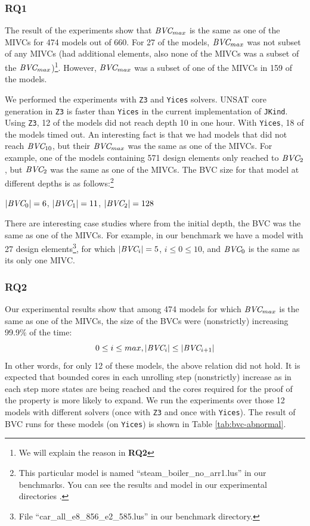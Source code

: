 \vspace{0.1in}
\subsubsection{RQ1}
The result of the experiments show that $\textit{BVC} _{max}$ is the same as one of the MIVCs for 474 models out of 660. For 27 of the models, $\textit{BVC} _{max}$ was not subset of any MIVCs (had additional elements, also none of the MIVCs was a subset of the $\textit{BVC} _{max}$)\footnote{We will explain the reason in \textbf{RQ2}}. However, $\textit{BVC} _{max}$ was a subset of one of the MIVCs in 159 of the models.

We performed the experiments with \texttt{Z3} and \texttt{Yices} solvers. UNSAT core generation in \texttt{Z3} is faster than \texttt{Yices} in the current implementation of \texttt{JKind}. Using \texttt{Z3}, 12 of the models did not reach depth 10 in one hour. With \texttt{Yices}, 18 of the models timed out. An interesting fact is that we had models that did not reach $\textit{BVC} _{10}$, but their $\textit{BVC} _{max}$ was the same as one of the MIVCs. For example, one of the models containing 571 design elements only reached to $\textit{BVC} _{2}$, but $\textit{BVC} _{2}$ was the same as one of the MIVCs.
The BVC size for that model at different depths is as follows:\footnote{This particular model is named ``steam\_boiler\_no\_arr1.lus'' in our benchmarks. You can see the results and model in our experimental directories \cite{expr}.}

$|\textit{BVC} _{0}| = 6$, $|\textit{BVC} _{1}| = 11$, $|\textit{BVC} _{2}| = 128$

There are interesting case studies where from the initial depth, the BVC was the same as one of the MIVCs. For example, in our benchmark we have a model with 27 design elements\footnote{File ``car\_all\_e8\_856\_e2\_585.lus'' in our benchmark directory.}, for which $|\textit{BVC} _{i}| = 5$, $i \leq 0 \le 10$, and $\textit{BVC} _{0}$ is the same as its only one MIVC.

\vspace{0.1in}
\subsubsection{RQ2}
Our experimental results show that among 474 models for which $\textit{BVC} _{max}$ is the same as one of the MIVCs, the size of the BVCs were (nonstrictly) increasing 99.9\% of the time:
      $$ 0 \leq i \le max, |\textit{BVC} _{i}| \leq |\textit{BVC} _{i+1}|$$
      In other words, for only 12 of these models, the above relation did not hold.
      It is expected that bounded cores in each unrolling step (nonstrictly) increase as in each step more states are being reached and the cores required for the proof of the property is more likely to expand.
      We run the experiments over those 12 models with different solvers (once with \texttt{Z3} and once with \texttt{Yices}). The result of BVC runs for these models (on \texttt{Yices}) is shown in Table \ref{tab:bvc-abnormal}.

